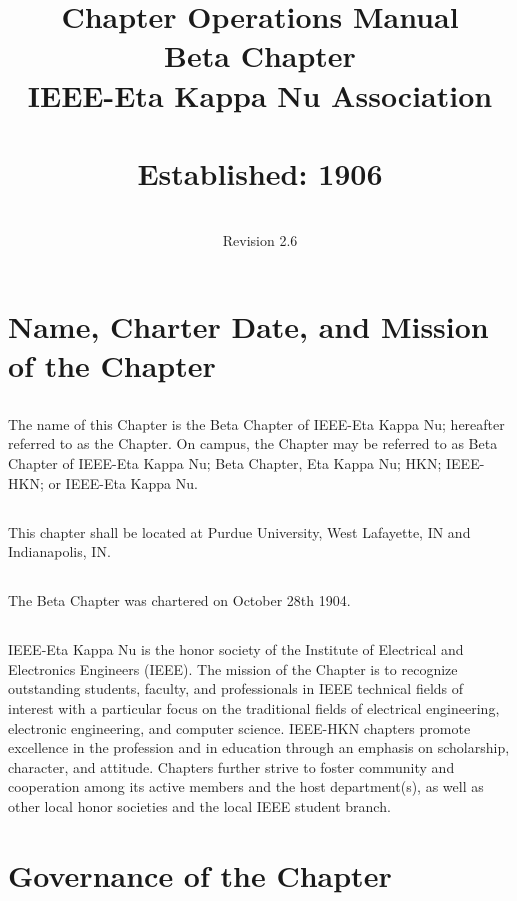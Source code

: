 \documentclass[10pt, oneside]{article}
\title{Chapter Operations Manual \\ Beta Chapter \\ IEEE-Eta Kappa Nu Association \\~\\ Established: 1906}
\author{\\Revision 2.6}
\date{}
\renewcommand{\thesection}{ARTICLE \Roman{section}}
\begin{document}
\pagestyle{fancy}
\fancyhead[R]{}
\renewcommand{\sectionmark}[1]{\markright{\MakeUppercase{\thesection. \ #1}}{}}
\renewcommand{\subsectionmark}[1]{}


\maketitle
\thispagestyle{empty}
\clearpage
\setcounter{page}{1}

\tableofcontents
\clearpage

\section{Name, Charter Date, and Mission of the Chapter}
\subsection{}
The name of this Chapter is the Beta Chapter of IEEE-Eta Kappa Nu; hereafter referred to as the Chapter. On campus, the Chapter may be referred to as Beta Chapter of IEEE-Eta Kappa Nu; Beta Chapter, Eta Kappa Nu; HKN; IEEE-HKN; or IEEE-Eta Kappa Nu.
\subsection{}
This chapter shall be located at Purdue University, West Lafayette, IN and Indianapolis, IN.
\subsection{}
The Beta Chapter was chartered on October 28th 1904.
\subsection{}
IEEE-Eta Kappa Nu is the honor society of the Institute of Electrical and Electronics Engineers (IEEE). The mission of the Chapter is to recognize outstanding students, faculty, and professionals in IEEE technical fields of interest with a particular focus on the traditional fields of electrical engineering, electronic engineering, and computer science. IEEE-HKN chapters promote excellence in the profession and in education through an emphasis on scholarship, character, and attitude. Chapters further strive to foster community and cooperation among its active members and the host department(s), as well as other local honor societies and the local IEEE student branch.

\section{Governance of the Chapter}
\end{document}
